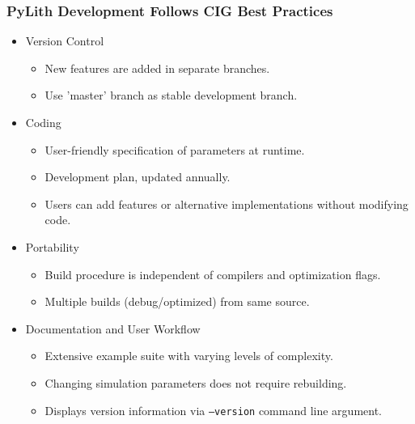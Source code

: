\documentclass[aspectratio=169]{beamer}
\begin{document}
\begin{frame}
  \frametitle{PyLith Development Follows CIG Best Practices}

  \begin{itemize}
  \item Version Control
    \begin{itemize}
    \item New features are added in separate branches.
    \item Use 'master' branch as stable development branch.
    \end{itemize}
  \item Coding
    \begin{itemize}
    \item User-friendly specification of parameters at runtime.
    \item Development plan, updated annually.
    \item Users can add features or alternative implementations without modifying code.
    \end{itemize}
  \item Portability
    \begin{itemize}
    \item Build procedure is independent of compilers and optimization flags.
    \item Multiple builds (debug/optimized) from same source.
    \end{itemize}
  \item Documentation and User Workflow
    \begin{itemize}
    \item Extensive example suite with varying levels of complexity.
    \item Changing simulation parameters does not require rebuilding.
    \item Displays version information via {\tt --version} command line argument.
    \end{itemize}
  \end{itemize}

\end{frame}
\end{document}
